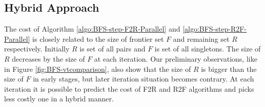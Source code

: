 \documentclass[12pt]{article}
\begin{document}
\subsection{Hybrid Approach}
\label{sec:BFS-Hybrid-parallel}
The cost of Algorithm \ref{algo:BFS-step-F2R-Parallel} and \ref{algo:BFS-step-R2F-Parallel} is closely related to the size of frontier set $F$ and remaining set $R$ respectively. Initially $R$ is set of all pairs and $F$ is set of all singletons. The size of $R$ decreases by the size of $F$ at each iteration. Our preliminary observations, like in Figure \ref{fig:BFS-vtcomparison}, also show that the size of $R$ is bigger than the size of $F$ in early stages, but later iteration situation becomes contrary. At each iteration it is possible to predict the cost of F2R and R2F algorithms and picks less costly one in a hybrid manner. 
\end{document}
